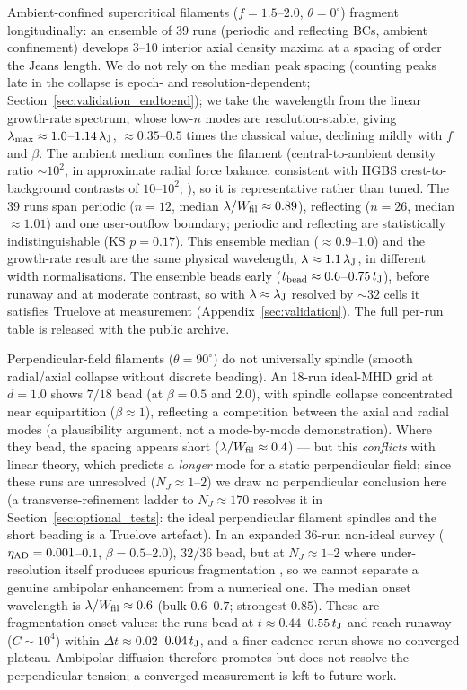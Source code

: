 \documentclass[usenatbib,twoside,twocolumn]{mnras}
\begin{document}
Ambient-confined supercritical filaments ($f=1.5$--$2.0$, $\theta=0^\circ$) fragment longitudinally: an ensemble of 39 runs (periodic and reflecting BCs, ambient confinement) develops 3--10 interior axial density maxima at a spacing of order the Jeans length. We do not rely on the median peak spacing (counting peaks late in the collapse is epoch- and resolution-dependent; Section~\ref{sec:validation_endtoend}); we take the wavelength from the linear growth-rate spectrum, whose low-$n$ modes are resolution-stable, giving $\lambda_{\rm max}\approx1.0$--$1.14\,\lambda_{\rm J}$, $\approx0.35$--$0.5$ times the classical value, declining mildly with $f$ and $\beta$. The ambient medium confines the filament (central-to-ambient density ratio $\sim10^2$, in approximate radial force balance, consistent with HGBS crest-to-background contrasts of $10$--$10^2$; \citealt{Arzoumanian2019}), so it is representative rather than tuned. The 39 runs span periodic ($n=12$, median $\lambda/W_{\rm fil}\approx0.89$), reflecting ($n=26$, median $\approx1.01$) and one user-outflow boundary; periodic and reflecting are statistically indistinguishable (KS $p=0.17$). This ensemble median ($\approx0.9$--$1.0$) and the growth-rate result are the same physical wavelength, $\lambda\approx1.1\,\lambda_{\rm J}$, in different width normalisations. The ensemble beads early ($t_{\rm bead}\approx0.6$--$0.75\,t_{\rm J}$), before runaway and at moderate contrast, so with $\lambda\approx\lambda_{\rm J}$ resolved by ${\sim}32$ cells it satisfies Truelove at measurement (Appendix~\ref{sec:validation}). The full per-run table is released with the public archive.

Perpendicular-field filaments ($\theta=90^\circ$) do not universally spindle (smooth radial/axial collapse without discrete beading). An 18-run ideal-MHD grid at $d=1.0$ shows $7/18$ bead (at $\beta=0.5$ and $2.0$), with spindle collapse concentrated near equipartition ($\beta\approx1$), reflecting a competition between the axial and radial modes (a plausibility argument, not a mode-by-mode demonstration). Where they bead, the spacing appears short ($\lambda/W_{\rm fil}\approx0.4$) --- but this \emph{conflicts} with linear theory, which predicts a \emph{longer} mode for a static perpendicular field; since these runs are unresolved ($N_J\approx1$--$2$) we draw no perpendicular conclusion here (a transverse-refinement ladder to $N_J\approx170$ resolves it in Section~\ref{sec:optional_tests}: the ideal perpendicular filament spindles and the short beading is a Truelove artefact). In an expanded 36-run non-ideal survey ($\eta_{\rm AD}=0.001$--$0.1$, $\beta=0.5$--$2.0$), $32/36$ bead, but at $N_J\approx1$--$2$ where under-resolution itself produces spurious fragmentation \citep{Truelove1997}, so we cannot separate a genuine ambipolar enhancement from a numerical one. The median onset wavelength is $\lambda/W_{\rm fil}\approx0.6$ (bulk $0.6$--$0.7$; strongest $0.85$). These are fragmentation-onset values: the runs bead at $t\approx0.44$--$0.55\,t_{\rm J}$ and reach runaway ($C\sim10^4$) within $\Delta t\approx0.02$--$0.04\,t_{\rm J}$, and a finer-cadence rerun shows no converged plateau. Ambipolar diffusion therefore promotes but does not resolve the perpendicular tension; a converged measurement is left to future work.
\end{document}
